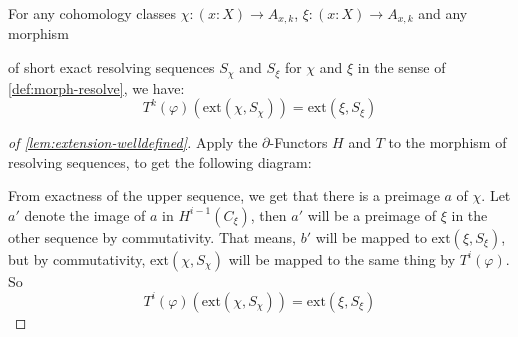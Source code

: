 \begin{lemma}
  \label{lem:extension-welldefined}
  For any cohomology classes $\chi:(x:X)\to A_{x,k}$, $\xi:(x:X)\to A_{x,k}$ and any morphism
  \begin{center}
  \end{center}
  of short exact resolving sequences $S_\chi$ and $S_\xi$ for $\chi$ and $\xi$
  in the sense of \cref{def:morph-resolve}, we have:
  \[ T^k(\varphi)(\mathrm{ext}(\chi,S_\chi)) = \mathrm{ext}(\xi,S_\xi) \]
\end{lemma}
\begin{proof}[of \cref{lem:extension-welldefined}]
  Apply the $\partial$-Functors $H$ and $T$ to the morphism of resolving sequences, to get the following diagram:
  \begin{center}
  \end{center}
  From exactness of the upper sequence, we get that there is a preimage $a$ of $\chi$.
  Let $a'$ denote the image of $a$ in $H^{i-1}(C_\xi)$,
  then $a'$ will be a preimage of $\xi$ in the other sequence by commutativity.
  That means, $b'$ will be mapped to $ \mathrm{ext}(\xi,S_\xi)$,
  but by commutativity, $\mathrm{ext}(\chi,S_\chi)$ will be mapped to the same thing by $T^i(\varphi)$.
  So
  \[ T^i(\varphi)(\mathrm{ext}(\chi,S_\chi))=\mathrm{ext}(\xi,S_\xi)\]
  
\end{proof}

